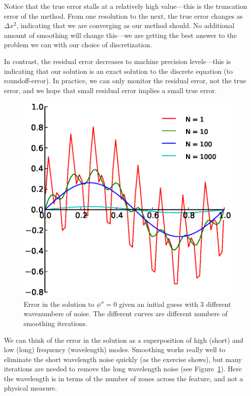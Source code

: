 Notice that the true error stalls at a relatively high value---this is
the truncation error of the method.  From one resolution to the next,
the true error changes as $\Delta x^2$, indicating that we are
converging as our method should.  No additional amount of smoothing
will change this---we are getting the best answer to the problem we
can with our choice of discretization.

In contrast, the residual error decreases to machine precision
levels---this is indicating that our solution is an exact solution to
the discrete equation (to roundoff-error).
In practice, we can only monitor the residual error, not the true
error, and we hope that small residual error implies a small true
error.

\begin{figure}[t]
\centering
\includegraphics{smooth_error}
\caption[Smoothing of different wavenumbers.]{\label{fig:smooth} Error
  in the solution to $\phi'' = 0$ given an initial guess with 3
  different wavenumbers of noise.  The different curves are different
  numbers of smoothing iterations.}
\end{figure}

We can think of the error in the solution as a superposition of high
(short) and low (long) frequency (wavelength) modes.  Smoothing works
really well to eliminate the short wavelength noise quickly (as the
exercise shows), but many iterations are needed to remove the long
wavelength noise (see Figure~\ref{fig:smooth}).  Here the wavelength
is in terms of the number of zones across the feature, and not a
physical measure.  

